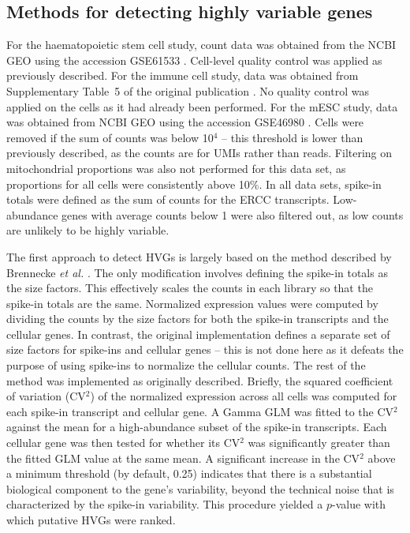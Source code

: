 \documentclass{article}
\begin{document}
\subsection{Methods for detecting highly variable genes}
For the haematopoietic stem cell study, count data was obtained from the NCBI GEO using the accession GSE61533 \cite{wilson2015combined}.
Cell-level quality control was applied as previously described.
For the immune cell study, data was obtained from Supplementary Table~5 of the original publication \cite{brennecke2013accounting}.
No quality control was applied on the cells as it had already been performed.
For the mESC study, data was obtained from NCBI GEO using the accession GSE46980 \cite{islam2014quantitative}.
Cells were removed if the sum of counts was below 10$^4$ -- this threshold is lower than previously described, as the counts are for UMIs rather than reads.
Filtering on mitochondrial proportions was also not performed for this data set, as proportions for all cells were consistently above 10\%.
In all data sets, spike-in totals were defined as the sum of counts for the ERCC transcripts.
Low-abundance genes with average counts below 1 were also filtered out, as low counts are unlikely to be highly variable.

The first approach to detect HVGs is largely based on the method described by Brennecke \textit{et al.} \cite{brennecke2013accounting}.
The only modification involves defining the spike-in totals as the size factors.
This effectively scales the counts in each library so that the spike-in totals are the same.
Normalized expression values were computed by dividing the counts by the size factors for both the spike-in transcripts and the cellular genes.
In contrast, the original implementation defines a separate set of size factors for spike-ins and cellular genes -- this is not done here as it defeats the purpose of using spike-ins to normalize the cellular counts.
The rest of the method was implemented as originally described.
Briefly, the squared coefficient of variation (CV$^2$) of the normalized expression across all cells was computed for each spike-in transcript and cellular gene.
A Gamma GLM was fitted to the CV$^2$ against the mean for a high-abundance subset of the spike-in transcripts.
Each cellular gene was then tested for whether its CV$^2$ was significantly greater than the fitted GLM value at the same mean.
A significant increase in the CV$^2$ above a minimum threshold (by default, 0.25) indicates that there is a substantial biological component to the gene's variability, beyond the technical noise that is characterized by the spike-in variability.
This procedure yielded a $p$-value with which putative HVGs were ranked.
\end{document}
